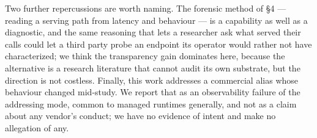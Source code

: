 \documentclass[10pt]{article}
\begin{document}
Two further repercussions are worth naming. The forensic method of \S4 --- reading
a serving path from latency and behaviour --- is a capability as well as a
diagnostic, and the same reasoning that lets a researcher ask what served their
calls could let a third party probe an endpoint its operator would rather not
have characterized; we think the transparency gain dominates here, because the
alternative is a research literature that cannot audit its own substrate, but
the direction is not costless. Finally, this work addresses a commercial alias
whose behaviour changed mid-study. We report that as an observability failure of
the addressing mode, common to managed runtimes generally, and not as a claim
about any vendor's conduct; we have no evidence of intent and make no
allegation of any.




\appendix

\end{document}
